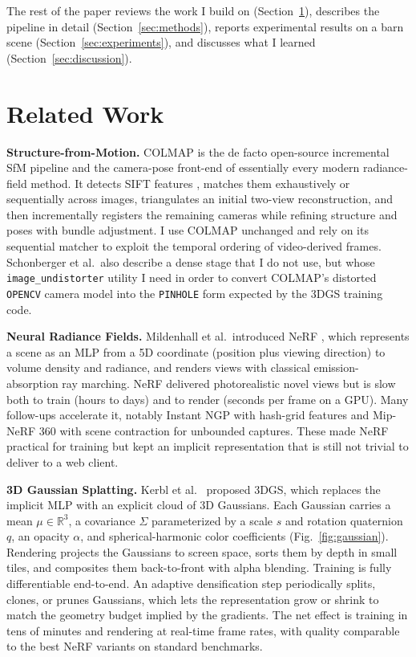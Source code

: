 \documentclass[conference]{IEEEtran}
\begin{document}
The rest of the paper reviews the work I build on (Section~\ref{sec:related}), describes the pipeline in detail (Section~\ref{sec:methods}), reports experimental results on a barn scene (Section~\ref{sec:experiments}), and discusses what I learned (Section~\ref{sec:discussion}).

\section{Related Work}\label{sec:related}

\textbf{Structure-from-Motion.} COLMAP \cite{schonberger2016sfm} is the de facto open-source incremental SfM pipeline and the camera-pose front-end of essentially every modern radiance-field method. It detects SIFT features \cite{lowe2004sift}, matches them exhaustively or sequentially across images, triangulates an initial two-view reconstruction, and then incrementally registers the remaining cameras while refining structure and poses with bundle adjustment. I use COLMAP unchanged and rely on its sequential matcher to exploit the temporal ordering of video-derived frames. Schonberger et al.\ also describe a dense stage \cite{schonberger2016mvs} that I do not use, but whose \texttt{image\_undistorter} utility I need in order to convert COLMAP's distorted \texttt{OPENCV} camera model into the \texttt{PINHOLE} form expected by the 3DGS training code.

\textbf{Neural Radiance Fields.} Mildenhall et al.\ introduced NeRF \cite{mildenhall2020nerf}, which represents a scene as an MLP from a 5D coordinate (position plus viewing direction) to volume density and radiance, and renders views with classical emission-absorption ray marching. NeRF delivered photorealistic novel views but is slow both to train (hours to days) and to render (seconds per frame on a GPU). Many follow-ups accelerate it, notably Instant NGP \cite{mueller2022instantngp} with hash-grid features and Mip-NeRF 360 \cite{barron2022mipnerf360} with scene contraction for unbounded captures. These made NeRF practical for training but kept an implicit representation that is still not trivial to deliver to a web client.

\textbf{3D Gaussian Splatting.} Kerbl et al.\ \cite{kerbl20233dgs} proposed 3DGS, which replaces the implicit MLP with an explicit cloud of 3D Gaussians. Each Gaussian carries a mean $\mu \in \mathbb{R}^3$, a covariance $\Sigma$ parameterized by a scale $s$ and rotation quaternion $q$, an opacity $\alpha$, and spherical-harmonic color coefficients (Fig.~\ref{fig:gaussian}). Rendering projects the Gaussians to screen space, sorts them by depth in small tiles, and composites them back-to-front with alpha blending. Training is fully differentiable end-to-end. An adaptive densification step periodically splits, clones, or prunes Gaussians, which lets the representation grow or shrink to match the geometry budget implied by the gradients. The net effect is training in tens of minutes and rendering at real-time frame rates, with quality comparable to the best NeRF variants on standard benchmarks.
\end{document}
